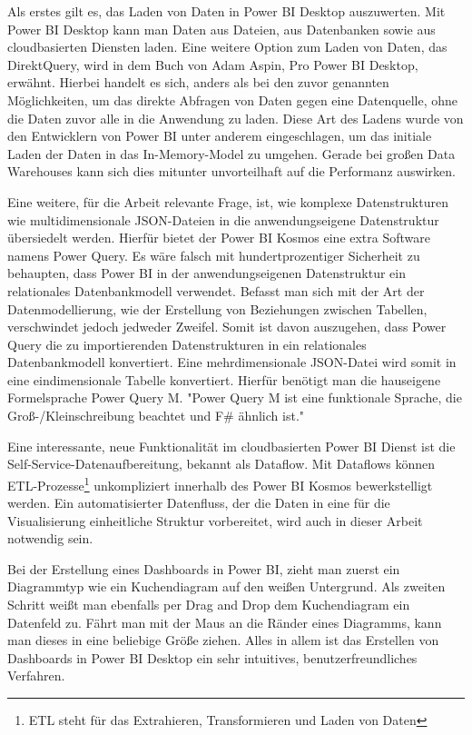 Als erstes gilt es, das Laden von Daten in Power BI Desktop auszuwerten. Mit Power BI Desktop kann man 
Daten aus Dateien, aus Datenbanken sowie aus cloudbasierten Diensten laden. Eine weitere Option zum Laden 
von Daten, das DirektQuery, wird in dem Buch von Adam Aspin, Pro Power BI Desktop, erwähnt. 
Hierbei handelt es sich, anders als bei den zuvor genannten Möglichkeiten, um das direkte
Abfragen von Daten gegen eine Datenquelle, ohne die Daten zuvor alle in die Anwendung zu laden.\cite[S. 111]{ProPowerBIDesktop}
Diese Art des Ladens wurde von den Entwicklern von Power BI unter anderem eingeschlagen,
um das initiale Laden der Daten in das In-Memory-Model zu umgehen. Gerade bei großen Data Warehouses
kann sich dies mitunter unvorteilhaft auf die Performanz auswirken.

Eine weitere, für die Arbeit relevante Frage, ist, wie komplexe Datenstrukturen wie multidimensionale JSON-Dateien
in die anwendungseigene Datenstruktur übersiedelt werden. Hierfür bietet der Power BI Kosmos eine extra Software
namens Power Query. Es wäre falsch mit hundertprozentiger Sicherheit zu behaupten, dass Power BI in der
anwendungseigenen Datenstruktur ein relationales Datenbankmodell verwendet. Befasst man sich mit der Art
der Datenmodellierung, wie der Erstellung von Beziehungen zwischen Tabellen, verschwindet jedoch jedweder Zweifel. \cite[S. 319]{ProPowerBIDesktop}
Somit ist davon auszugehen, dass Power Query die zu importierenden Datenstrukturen in ein relationales Datenbankmodell
konvertiert. Eine mehrdimensionale JSON-Datei wird somit in eine eindimensionale Tabelle konvertiert.
Hierfür benötigt man die hauseigene Formelsprache Power Query M. "Power Query M ist eine funktionale Sprache,
die Groß-/Kleinschreibung beachtet und F\# ähnlich ist."\cite{MicrosoftDocsPowerQueryFormelsprache}

Eine interessante, neue Funktionalität im cloudbasierten Power BI Dienst ist die Self-Service-Datenaufbereitung,
bekannt als Dataflow. Mit Dataflows können ETL-Prozesse\footnote{ETL steht für das Extrahieren, Transformieren und Laden von Daten}
unkompliziert innerhalb des Power BI Kosmos bewerkstelligt werden. Ein automatisierter Datenfluss,
der die Daten in eine für die Visualisierung einheitliche Struktur vorbereitet, wird auch in dieser
Arbeit notwendig sein.

Bei der Erstellung eines Dashboards in Power BI, zieht man zuerst ein Diagrammtyp wie ein Kuchendiagram
auf den weißen Untergrund. Als zweiten Schritt weißt man ebenfalls per Drag and Drop dem Kuchendiagram ein
Datenfeld zu. Fährt man mit der Maus an die Ränder eines Diagramms, kann man dieses in eine beliebige Größe
ziehen. Alles in allem ist das Erstellen von Dashboards in Power BI Desktop ein sehr intuitives,
benutzerfreundliches Verfahren.

